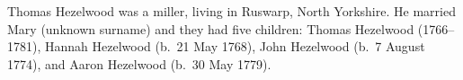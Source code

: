
Thomas Hezelwood was a miller, living in Ruswarp, North Yorkshire. He married Mary (unknown surname) and they had five children: Thomas Hezelwood (1766--1781), Hannah Hezelwood (b.\ 21 May 1768), John Hezelwood (b.\ 7 August 1774),  and Aaron Hezelwood (b.\ 30 May 1779). \cite{THezelwoodChildren}
